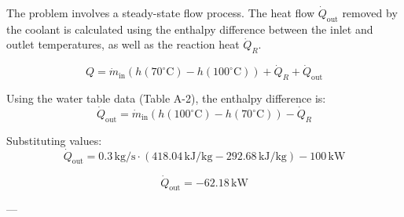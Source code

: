 The problem involves a steady-state flow process. The heat flow \( \dot{Q}_{\text{out}} \) removed by the coolant is calculated using the enthalpy difference between the inlet and outlet temperatures, as well as the reaction heat \( \dot{Q}_R \).  

\[
Q = \dot{m}_{\text{in}} \left( h(70^\circ\text{C}) - h(100^\circ\text{C}) \right) + \dot{Q}_R + \dot{Q}_{\text{out}}
\]  

Using the water table data (Table A-2), the enthalpy difference is:  
\[
\dot{Q}_{\text{out}} = \dot{m}_{\text{in}} \left( h(100^\circ\text{C}) - h(70^\circ\text{C}) \right) - \dot{Q}_R
\]  

Substituting values:  
\[
\dot{Q}_{\text{out}} = 0.3 \, \text{kg/s} \cdot \left( 418.04 \, \text{kJ/kg} - 292.68 \, \text{kJ/kg} \right) - 100 \, \text{kW}
\]  

\[
\dot{Q}_{\text{out}} = -62.18 \, \text{kW}
\]  

---